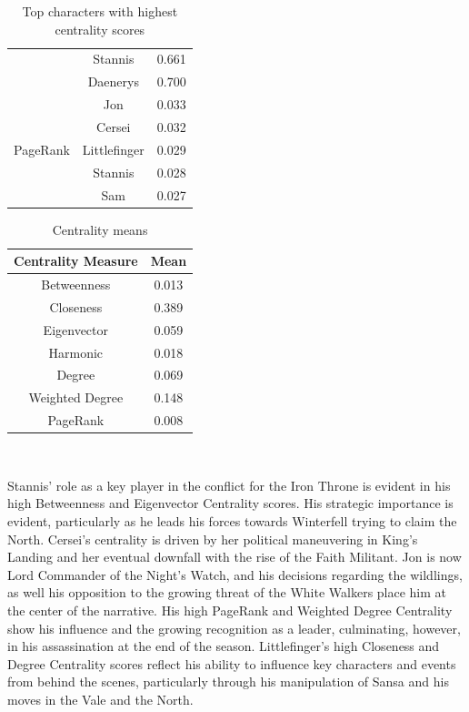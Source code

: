\documentclass[10pt,twocolumn,letterpaper]{article}
\begin{document}
\begin{table}[!h]
\begin{tabular}{c|c|c}
                    & Stannis & 0.661 \\
                    & Daenerys & 0.700 \\
        \hline
                    & Jon & 0.033 \\
                    & Cersei & 0.032 \\
        PageRank    & Littlefinger & 0.029 \\
                    & Stannis & 0.028 \\
                    & Sam & 0.027 \\
        \hline
    \end{tabular}
    \vspace{0.2cm}
    \caption{Top characters with highest centrality scores}
    \label{tab:my_label}
\end{table}




\begin{table}[!h]
    \centering
    \begin{tabular}{c|c}
        Centrality Measure & Mean  \\
        \hline
        Betweenness & 0.013 \\
        Closeness & 0.389 \\
        Eigenvector & 0.059 \\
        Harmonic & 0.018 \\
        Degree & 0.069 \\
        Weighted Degree & 0.148 \\
        PageRank & 0.008 \\
        \hline 
    \end{tabular} \\
    \caption{Centrality means}
    \label{tab:my_label}
\end{table}

Stannis’ role as a key player in the conflict for the Iron Throne is evident in his high Betweenness and Eigenvector Centrality scores. His strategic importance is evident, particularly as he leads his forces towards Winterfell trying to claim the North. Cersei's centrality is driven by her political maneuvering in King's Landing and her eventual downfall with the rise of the Faith Militant. Jon is now Lord Commander of the Night’s Watch, and his decisions regarding the wildlings, as well his opposition to the growing threat of the White Walkers place him at the center of the narrative. His high PageRank and Weighted Degree Centrality show his influence and the growing recognition as a leader, culminating, however, in his assassination at the end of the season. Littlefinger's high Closeness and Degree Centrality scores reflect his ability to influence key characters and events from behind the scenes, particularly through his manipulation of Sansa and his moves in the Vale and the North.
\end{document}
